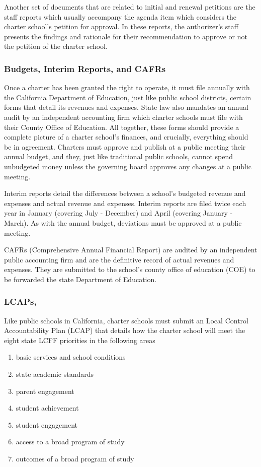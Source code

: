 Another set of documents that are related to initial and renewal petitions are the staff reports which usually accompany the agenda item which considers the charter school's petition for approval. In these reports, the authorizer's staff presents the findings and rationale for their recommendation to approve or not the petition of the charter school.

\subsubsection{Budgets,  Interim Reports, and CAFRs}\label{sec:budgets-etc}\indent

Once a charter has been granted the right to operate, it must file annually with the California Department of Education, just like public school districts, certain forms that detail its revenues and expenses. State law also mandates an annual audit by an independent accounting firm which charter schools must file with their County Office of Education. All together, these forms should provide a complete picture of a charter school's finances, and crucially, everything should be in agreement. Charters must approve and publish at a public meeting their annual budget, and they, just like traditional public schools, cannot spend unbudgeted money unless the governing board approves any changes at a public meeting.

Interim reports detail the differences between a school's budgeted revenue and expenses and actual revenue and expenses. Interim reports are filed twice each year in January (covering July - December) and April (covering January - March). As with the annual budget, deviations must be approved at a public meeting.

CAFRs (Comprehensive Annual Financial Report) are audited by an independent public accounting firm and are the definitive record of actual revenues and expenses. They are submitted to the school's county office of education (COE) to be forwarded the state Department of Education.

\subsubsection{LCAPs,}\label{sec:cs-lcaps}\indent

Like public schools in California, charter schools must submit an Local Control Accountability Plan (LCAP) that details how the charter school will meet the eight state LCFF priorities in the following areas
\begin{enumerate}
  \item basic services and school conditions
  \item state academic standards
  \item parent engagement
  \item student achievement
  \item student engagement
  \item access to a broad program of study
  \item outcomes of a broad program of study
\end{enumerate}

